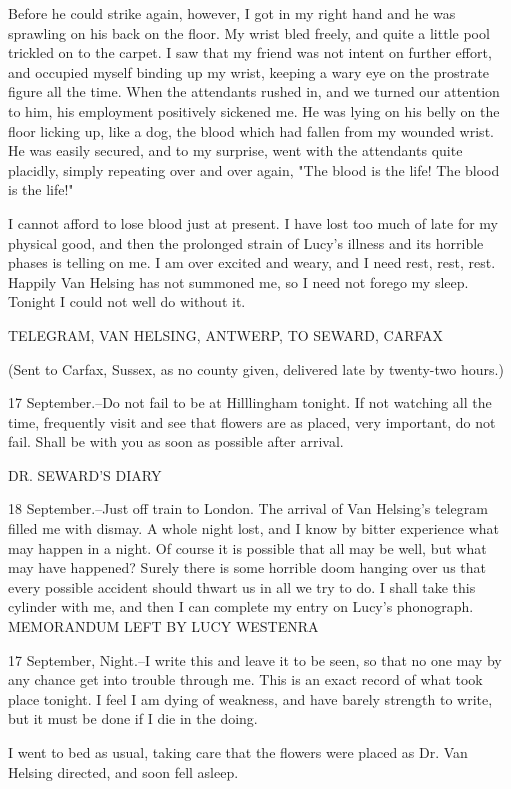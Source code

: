 Before he could strike again, however, I got in my right hand and he was sprawling on his back on the floor. My wrist bled freely, and quite a little pool trickled on to the carpet. I saw that my friend was not intent on further effort, and occupied myself binding up my wrist, keeping a wary eye on the prostrate figure all the time. When the attendants rushed in, and we turned our attention to him, his employment positively sickened me. He was lying on his belly on the floor licking up, like a dog, the blood which had fallen from my wounded wrist. He was easily secured, and to my surprise, went with the attendants quite placidly, simply repeating over and over again, "The blood is the life! The blood is the life!" 

I cannot afford to lose blood just at present. I have lost too much of late for my physical good, and then the prolonged strain of Lucy's illness and its horrible phases is telling on me. I am over excited and weary, and I need rest, rest, rest. Happily Van Helsing has not summoned me, so I need not forego my sleep. Tonight I could not well do without it. 

TELEGRAM, VAN HELSING, ANTWERP, TO SEWARD, CARFAX 

(Sent to Carfax, Sussex, as no county given, delivered late by twenty-two hours.) 

17 September.--Do not fail to be at Hilllingham tonight. If not watching all the time, frequently visit and see that flowers are as placed, very important, do not fail. Shall be with you as soon as possible after arrival. 

DR. SEWARD'S DIARY 

18 September.--Just off train to London. The arrival of Van Helsing's telegram filled me with dismay. A whole night lost, and I know by bitter experience what may happen in a night. Of course it is possible that all may be well, but what may have happened? Surely there is some horrible doom hanging over us that every possible accident should thwart us in all we try to do. I shall take this cylinder with me, and then I can complete my entry on Lucy's phonograph. MEMORANDUM LEFT BY LUCY WESTENRA 

17 September, Night.--I write this and leave it to be seen, so that no one may by any chance get into trouble through me. This is an exact record of what took place tonight. I feel I am dying of weakness, and have barely strength to write, but it must be done if I die in the doing. 

I went to bed as usual, taking care that the flowers were placed as Dr. Van Helsing directed, and soon fell asleep. 

